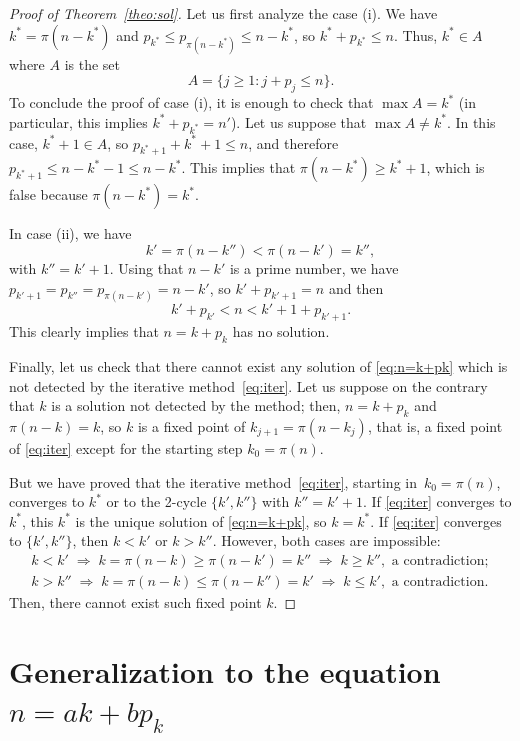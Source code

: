 \documentclass[12pt,reqno]{article}
\begin{document}
\begin{proof}[Proof of Theorem~\ref{theo:sol}]
Let us first analyze the case (i). 
We have $k^{*} = \pi(n-k^{*})$ and $p_{k^{*}} \le p_{\pi(n-k^{*})} \le n-k^{*}$, so $k^{*} + p_{k^{*}} \le n$. Thus, $k^{*} \in A$ where $A$ is the set
\[
  A = \{ j \ge 1 : j + p_j \le n \}.
\]
To conclude the proof of case (i), it is enough to check that $\max A = k^{*}$ (in particular, this implies $k^{*} + p_{k^{*}} = n'$). 
Let us suppose that $\max A \ne k^{*}$. In this case, $k^{*}+1 \in A$, so $p_{k^{*}+1} + k^{*}+1 \le n$, and therefore $p_{k^{*}+1} \le n - k^{*} - 1 \le n - k^{*}$. This implies that $\pi(n-k^{*}) \ge k^{*} + 1$, which is false because $\pi(n-k^{*}) = k^{*}$.

In case (ii), we have
\[
  k' = \pi(n-k'') < \pi(n-k') = k'',
\]
with $k'' = k'+1$.
Using that $n-k'$ is a prime number, we have
$p_{k'+1} = p_{k''} = p_{\pi(n-k')} = n-k'$, so $k' + p_{k'+1} = n$ and then
\[
k' + p_{k'} < n < k'+1 + p_{k'+1}.
\]
This clearly implies that $n = k + p_k$ has no solution.

Finally, let us check that there cannot exist any solution of \eqref{eq:n=k+pk} which is 
not detected by the iterative method~\eqref{eq:iter}. 
Let us suppose on the contrary that $k$ is a solution not detected by the method;
then, $n = k + p_k$ and $\pi(n-k) = k$, so $k$ is a fixed point of
$k_{j+1} = \pi(n-k_j)$, that is, a fixed point of \eqref{eq:iter} except for the starting step $k_0 = \pi(n)$.

But we have proved that the iterative method~\eqref{eq:iter}, starting 
in~$k_0 = \pi(n)$, converges to $k^{*}$ or to the 2-cycle $\{k',k''\}$
with $k''=k'+1$. If \eqref{eq:iter} converges to $k^{*}$, this $k^{*}$ is the unique solution of
\eqref{eq:n=k+pk}, so $k=k^{*}$.
If \eqref{eq:iter} converges to $\{k',k''\}$, then $k<k'$ or $k>k''$. 
However, both cases are impossible:
\begin{equation}
\label{eq:kk'k''}
\begin{gathered}
k < k' \;\Rightarrow\; k = \pi(n-k) \ge \pi(n-k') = k'' \;\Rightarrow\; k \ge k'', \text{ a contradiction};
\\
k > k'' \;\Rightarrow\; k = \pi(n-k) \le \pi(n-k'') = k' \;\Rightarrow\; k \le k', \text{ a contradiction}.
\end{gathered}
\end{equation}
Then, there cannot exist such fixed point $k$.
\end{proof}

\section{Generalization to the equation $n = a k + b p_k$}
\label{sec:gen}
\end{document}
